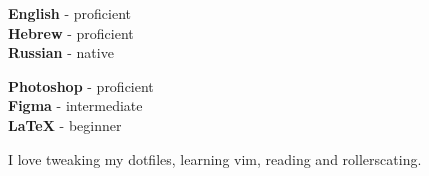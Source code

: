 \documentclass[9pt]{developercv} %
\begin{document}
\begin{minipage}[t]{0.3\textwidth}
	\vspace{-\baselineskip} %

	
	\textbf{English} - proficient\\
	\textbf{Hebrew} - proficient\\
	\textbf{Russian} - native\\
\end{minipage}
\hfill
\begin{minipage}[t]{0.3\textwidth}
	\vspace{-\baselineskip} %
	
  
  \textbf{Photoshop} - proficient \\
  \textbf{Figma} - intermediate \\ 
  \textbf{\LaTeX} - beginner \\ 
	
	\end{minipage}
\hfill
\begin{minipage}[t]{0.3\textwidth}
	\vspace{-\baselineskip} %
	
	
  I love tweaking my dotfiles, learning vim, reading and rollerscating.
	\end{minipage}
\hfill

\end{document}
